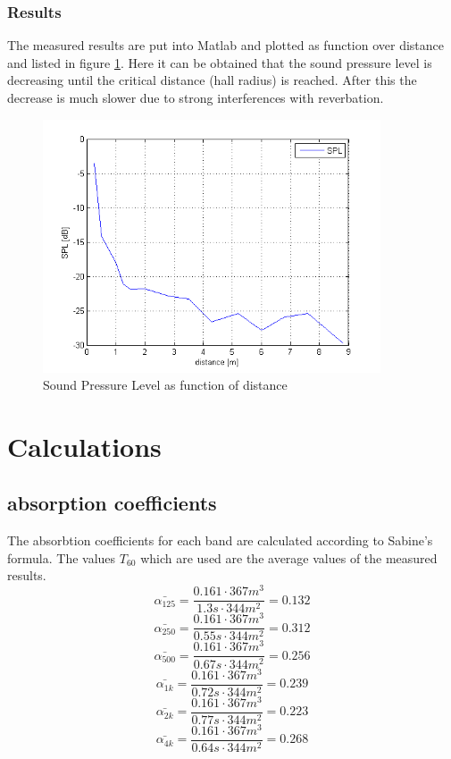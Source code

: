 \documentclass{article}
\begin{document}
\subsubsection{Results}
The measured results are put into Matlab and plotted as function over distance and listed in figure \ref{fig:spl}. Here it can be obtained that the sound pressure level is decreasing until the critical distance (hall radius) is reached. After this the decrease is much slower due to strong interferences with reverbation.
\begin{figure}[htbp]
\begin{center}
\includegraphics[width=10cm,keepaspectratio=true]{SPL}
\caption{Sound Pressure Level as function of distance}
\label{fig:spl}
\end{center}
\end{figure}

\newpage
\section{Calculations}
\subsection{absorption coefficients}
The absorbtion coefficients for each band are calculated according to Sabine's formula. The values $T_{60}$ which are used are the average values of the measured results. 
$$\bar{\alpha_{125}}=\frac{0.161\cdot 367m^3}{1.3s\cdot 344m^2}=0.132$$
$$\bar{\alpha_{250}}=\frac{0.161\cdot 367m^3}{0.55s\cdot 344m^2}=0.312$$
$$\bar{\alpha_{500}}=\frac{0.161\cdot 367m^3}{0.67s\cdot 344m^2}=0.256$$
$$\bar{\alpha_{1k}}=\frac{0.161\cdot 367m^3}{0.72s\cdot 344m^2}=0.239$$
$$\bar{\alpha_{2k}}=\frac{0.161\cdot 367m^3}{0.77s\cdot 344m^2}=0.223$$
$$\bar{\alpha_{4k}}=\frac{0.161\cdot 367m^3}{0.64s\cdot 344m^2}=0.268$$
\end{document}
